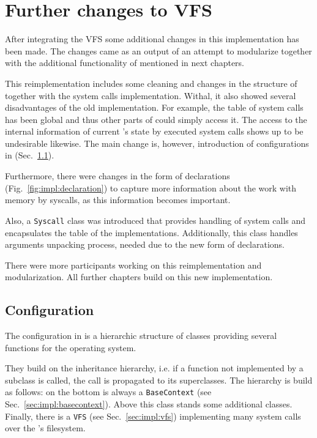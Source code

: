 \section{Further changes to VFS} \label{sec:impl:changes}
 
 After integrating the VFS some additional changes in this implementation has been made. The changes came as an output of an attempt to modularize \dios together with the additional functionality of \dios mentioned in next chapters.
 
 This reimplementation includes some cleaning and changes in the structure of \dios together with the system calls implementation. Withal, it also showed several disadvantages of the old implementation. For example, the table of system calls has been global and thus other parts of \dios could simply access it. The access to the internal information of current \dios's state by executed system calls shows up to be undesirable likewise. The main change is, however, introduction of configurations in \dios (Sec.~\ref{sec:impl:config}).
 
 Furthermore, there were changes in the form of declarations (Fig.~\ref{fig:impl:declaration}) to capture more information about the work with memory by syscalls, as this information becomes important.
 
 Also, a \texttt{Syscall} class was introduced that provides handling of system calls and encapsulates the table of the implementations. Additionally, this class handles arguments unpacking process, needed due to the new form of declarations.
 
 There were more participants working on this reimplementation and modularization. All further chapters build on this new implementation.
 
 \subsection{Configuration} \label{sec:impl:config}
 
 The configuration in \dios is a hierarchic structure of classes providing several functions for the operating system.
 
  They build on the inheritance hierarchy, i.e. if a function not implemented by a subclass is called, the call is propagated to its superclasses. The hierarchy is build as follows: on the bottom is always a \texttt{BaseContext} (see Sec.~\ref{sec:impl:basecontext}). Above this class stands some additional classes. Finally, there is a \texttt{VFS} (see Sec.~\ref{sec:impl:vfs}) implementing many system calls over the \dios's filesystem.
 
